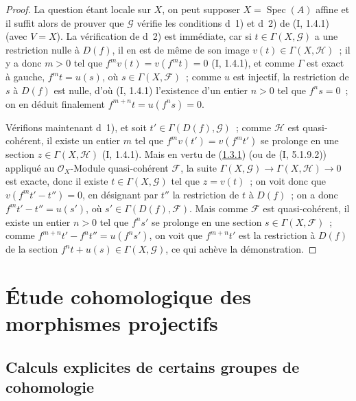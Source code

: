 \begin{proof}
La question étant locale sur $X$, on peut supposer
$X=\operatorname{Spec}(A)$ affine et il suffit alors de prouver que
$\mathcal G$ vérifie les conditions d~1) et d~2) de (I, 1.4.1) (avec
$V=X$). La vérification de d~2) est immédiate, car si
$t\in\Gamma(X,\mathcal G)$ a une restriction nulle à $D(f)$, il en est de
même de son image $v(t)\in\Gamma(X,\mathcal H)$~; il y a donc $m>0$ tel que
$f^mv(t)=v(f^mt)=0$ (I, 1.4.1), et comme $\Gamma$ est exact à gauche,
$f^mt=u(s)$, où $s\in\Gamma(X,\mathcal F)$~; comme $u$ est injectif, la
restriction de $s$ à $D(f)$ est nulle, d'où (I, 1.4.1) l'existence d'un
entier $n>0$ tel que $f^ns=0$~; on en déduit finalement
$f^{m+n}t=u(f^ns)=0$.

Vérifions maintenant d~1), et soit $t'\in\Gamma(D(f),\mathcal G)$~; comme
$\mathcal H$ est quasi-cohérent, il existe un entier $m$ tel que
$f^mv(t')=v(f^mt')$ se prolonge en une section
$z\in\Gamma(X,\mathcal H)$ (I, 1.4.1). Mais en vertu de
(\hyperref[III.1.3.1-fr]{1.3.1}) (ou de (I, 5.1.9.2)) appliqué au
$\mathcal O_X$-Module quasi-cohérent $\mathcal F$, la suite
$\Gamma(X,\mathcal G)\to\Gamma(X,\mathcal H)\to0$ est exacte, donc il existe
$t\in\Gamma(X,\mathcal G)$ tel que $z=v(t)$~; on voit donc que
$v(f^mt'-t'')=0$, en désignant par $t''$ la restriction de $t$ à $D(f)$~;
on a donc $f^mt'-t''=u(s')$, où $s'\in\Gamma(D(f),\mathcal F)$. Mais comme
$\mathcal F$ est quasi-cohérent, il existe un entier $n>0$ tel que $f^ns'$
se prolonge en une section $s\in\Gamma(X,\mathcal F)$~; comme
$f^{m+n}t'-f^nt''=u(f^ns')$, on voit que $f^{m+n}t'$ est la restriction à
$D(f)$ de la section $f^nt+u(s)\in\Gamma(X,\mathcal G)$, ce qui achève
la démonstration.
\end{proof}

\section{Étude cohomologique des morphismes projectifs}
\label{section:III.2-fr}

\subsection{Calculs explicites de certains groupes de cohomologie}
\label{subsection:III.2.1-fr}

